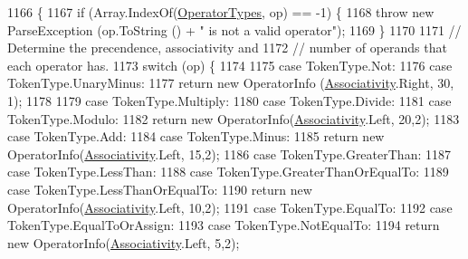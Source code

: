 \begin{DoxyCode}
1166                                                                        \{
1167                 \textcolor{keywordflow}{if} (Array.IndexOf(\hyperlink{a00145_ad8a4bb1b46dbc3d1b7708e78a2d97e1c}{OperatorTypes}, op) == -1) \{
1168                     \textcolor{keywordflow}{throw} \textcolor{keyword}{new} ParseException (op.ToString () + \textcolor{stringliteral}{" is not a valid operator"});
1169                 \}
1170 
1171                 \textcolor{comment}{// Determine the precendence, associativity and}
1172                 \textcolor{comment}{// number of operands that each operator has.}
1173                 \textcolor{keywordflow}{switch} (op) \{
1174 
1175                 \textcolor{keywordflow}{case} TokenType.Not:
1176                 \textcolor{keywordflow}{case} TokenType.UnaryMinus:
1177                     \textcolor{keywordflow}{return} \textcolor{keyword}{new} OperatorInfo (\hyperlink{a00145_a83fa1b8db0e6678006920812b6f33f62}{Associativity}.Right, 30, 1);
1178 
1179                 \textcolor{keywordflow}{case} TokenType.Multiply:
1180                 \textcolor{keywordflow}{case} TokenType.Divide:
1181                 \textcolor{keywordflow}{case} TokenType.Modulo:
1182                     \textcolor{keywordflow}{return} \textcolor{keyword}{new} OperatorInfo(\hyperlink{a00145_a83fa1b8db0e6678006920812b6f33f62}{Associativity}.Left, 20,2);
1183                 \textcolor{keywordflow}{case} TokenType.Add:
1184                 \textcolor{keywordflow}{case} TokenType.Minus:
1185                     \textcolor{keywordflow}{return} \textcolor{keyword}{new} OperatorInfo(\hyperlink{a00145_a83fa1b8db0e6678006920812b6f33f62}{Associativity}.Left, 15,2);
1186                 \textcolor{keywordflow}{case} TokenType.GreaterThan:
1187                 \textcolor{keywordflow}{case} TokenType.LessThan:
1188                 \textcolor{keywordflow}{case} TokenType.GreaterThanOrEqualTo:
1189                 \textcolor{keywordflow}{case} TokenType.LessThanOrEqualTo:
1190                     \textcolor{keywordflow}{return} \textcolor{keyword}{new} OperatorInfo(\hyperlink{a00145_a83fa1b8db0e6678006920812b6f33f62}{Associativity}.Left, 10,2);
1191                 \textcolor{keywordflow}{case} TokenType.EqualTo:
1192                 \textcolor{keywordflow}{case} TokenType.EqualToOrAssign:
1193                 \textcolor{keywordflow}{case} TokenType.NotEqualTo:
1194                     \textcolor{keywordflow}{return} \textcolor{keyword}{new} OperatorInfo(\hyperlink{a00145_a83fa1b8db0e6678006920812b6f33f62}{Associativity}.Left, 5,2);

\end{DoxyCode}
